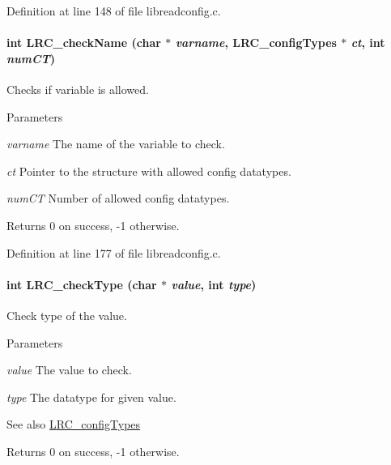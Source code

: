 Definition at line 148 of file libreadconfig.c.\hypertarget{group___l_r_c__internals_ga40dad9664f69eed3491f5753db5a76b0}{
\paragraph[{LRC\_\-checkName}]{\setlength{\rightskip}{0pt plus 5cm}int LRC\_\-checkName (char $\ast$ {\em varname}, \/  {\bf LRC\_\-configTypes} $\ast$ {\em ct}, \/  int {\em numCT})}\hfill}
\label{group___l_r_c__internals_ga40dad9664f69eed3491f5753db5a76b0}


Checks if variable is allowed. 
\begin{DoxyParams}{Parameters}
\item[{\em varname}]The name of the variable to check.\item[{\em ct}]Pointer to the structure with allowed config datatypes.\item[{\em numCT}]Number of allowed config datatypes.\end{DoxyParams}
\begin{DoxyReturn}{Returns}
0 on success, -\/1 otherwise. 
\end{DoxyReturn}


Definition at line 177 of file libreadconfig.c.\hypertarget{group___l_r_c__internals_ga727eec2e862e3acf7206d11cd2636127}{
\paragraph[{LRC\_\-checkType}]{\setlength{\rightskip}{0pt plus 5cm}int LRC\_\-checkType (char $\ast$ {\em value}, \/  int {\em type})}\hfill}
\label{group___l_r_c__internals_ga727eec2e862e3acf7206d11cd2636127}


Check type of the value. 
\begin{DoxyParams}{Parameters}
\item[{\em value}]The value to check.\item[{\em type}]The datatype for given value. \end{DoxyParams}
\begin{DoxySeeAlso}{See also}
\hyperlink{struct_l_r_c__config_types}{LRC\_\-configTypes}
\end{DoxySeeAlso}
\begin{DoxyReturn}{Returns}
0 on success, -\/1 otherwise. 
\end{DoxyReturn}


